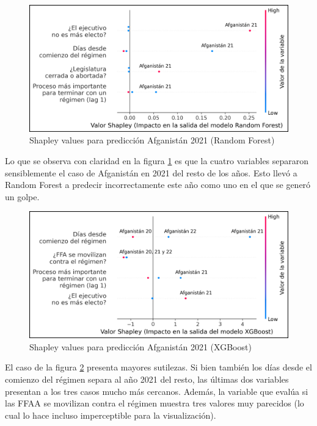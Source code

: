 \documentclass{article}
\begin{document}
\begin{figure}[H]
 \centering
 \includegraphics[width=.75\textwidth]{13_shapley_values_rf_afganistan.png}
 \caption{Shapley values para predicción Afganistán 2021 (Random Forest)\label{fig:shapley_rf_afganistan}}
\end{figure}

Lo que se observa con claridad en la figura \ref{fig:shapley_rf_afganistan} es que la cuatro variables
separaron sensiblemente el caso de Afganistán en 2021 del resto de los años. Esto llevó a Random Forest
a predecir incorrectamente este año como uno en el que se generó un golpe.

\begin{figure}[H]
 \centering
 \includegraphics[width=.75\textwidth]{14_shapley_values_xgb_afganistan.png}
 \caption{Shapley values para predicción Afganistán 2021 (XGBoost)\label{fig:shapley_xgb_afganistan}}
\end{figure}

El caso de la figura \ref{fig:shapley_xgb_afganistan} presenta mayores sutilezas. Si bien también
los días desde el comienzo del régimen separa al año 2021 del resto, las últimas dos variables 
presentan a los tres casos mucho más cercanos. Además, la variable que evalúa si las FFAA se movilizan
contra el régimen muestra tres valores muy parecidos (lo cual lo hace incluso imperceptible para la
visualización).
\end{document}
